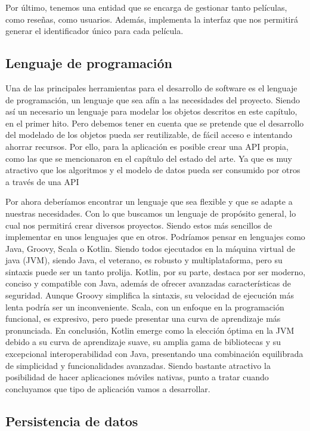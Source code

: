 Por último, tenemos una entidad que se encarga de gestionar tanto películas, como reseñas, como 
usuarios. Además, implementa la interfaz que nos permitirá generar el identificador único para cada 
película.

\subsection{Lenguaje de programación}

Una de las principales herramientas para el desarrollo de software es el lenguaje de programación, un 
lenguaje que sea afín a las necesidades del proyecto. Siendo así un necesario un lenguaje para modelar 
los objetos descritos en este capítulo, en el primer hito. Pero debemos tener en cuenta que se pretende 
que el desarrollo del modelado de los objetos pueda ser reutilizable, de fácil acceso e intentando 
ahorrar recursos. Por ello, para la aplicación es posible crear una API propia, como las que se 
mencionaron en el capítulo del estado del arte. Ya que es muy atractivo que los algoritmos y el modelo 
de datos pueda ser consumido por otros a través de una API

Por ahora deberíamos encontrar un lenguaje que sea flexible y que se adapte a nuestras necesidades. Con 
lo que buscamos un lenguaje de propósito general, lo cual nos permitirá crear diversos proyectos. 
Siendo estos más sencillos de implementar en unos lenguajes que en otros. Podríamos pensar en lenguajes 
como Java, Groovy, Scala o Kotlin. Siendo todos ejecutados en la máquina virtual de java (JVM), siendo 
Java, el veterano, es robusto y multiplataforma, pero su sintaxis puede ser un tanto prolija. Kotlin, 
por su parte, destaca por ser moderno, conciso y compatible con Java, además de ofrecer avanzadas 
características de seguridad. Aunque Groovy simplifica la sintaxis, su velocidad de ejecución más lenta 
podría ser un inconveniente. Scala, con un enfoque en la programación funcional, es expresivo, pero 
puede presentar una curva de aprendizaje más pronunciada. En conclusión, Kotlin emerge como la elección 
óptima en la JVM debido a su curva de aprendizaje suave, su amplia gama de bibliotecas y su excepcional 
interoperabilidad con Java, presentando una combinación equilibrada de simplicidad y funcionalidades 
avanzadas. Siendo bastante atractivo la posibilidad de hacer aplicaciones móviles nativas, punto a 
tratar cuando concluyamos que tipo de aplicación vamos a desarrollar.

\subsection{Persistencia de datos}

